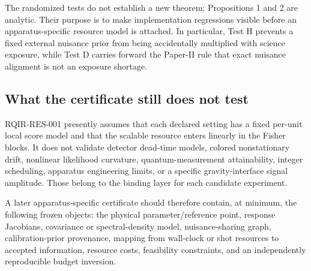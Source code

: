 The randomized tests do not establish a new theorem; Propositions 1 and 2 are analytic. Their purpose is to make implementation regressions visible before an apparatus-specific resource model is attached. In particular, Test H prevents a fixed external nuisance prior from being accidentally multiplied with science exposure, while Test D carries forward the Paper-II rule that exact nuisance alignment is not an exposure shortage.

\subsection{What the certificate still does not test}

RQIR-RES-001 presently assumes that each declared setting has a fixed per-unit local score model and that the scalable resource enters linearly in the Fisher blocks. It does not validate detector dead-time models, colored nonstationary drift, nonlinear likelihood curvature, quantum-measurement attainability, integer scheduling, apparatus engineering limits, or a specific gravity-interface signal amplitude. Those belong to the binding layer for each candidate experiment.

A later apparatus-specific certificate should therefore contain, at minimum, the following frozen objects: the physical parameter/reference point, response Jacobians, covariance or spectral-density model, nuisance-sharing graph, calibration-prior provenance, mapping from wall-clock or shot resources to accepted information, resource costs, feasibility constraints, and an independently reproducible budget inversion.
